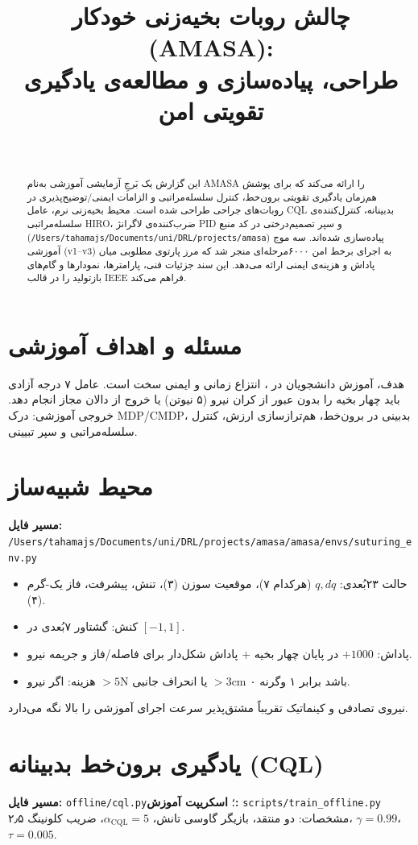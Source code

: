 \documentclass[conference]{IEEEtran}
\title{چالش روبات بخیه‌زنی خودکار (AMASA):\\
طراحی، پیاده‌سازی و مطالعه‌ی یادگیری تقویتی امن}
\author{\IEEEauthorblockN{کدکس}\\
\IEEEauthorblockA{/Users/tahamajs/Documents/uni/DRL/projects/amasa}}
\begin{document}
\maketitle
\begin{abstract}
این گزارش یک بَرجِ آزمایشی آموزشی به‌نام AMASA را ارائه می‌کند که برای پوشش هم‌زمان یادگیری تقویتی برون‌خط، کنترل سلسله‌مراتبی و الزامات ایمنی/توضیح‌پذیری در روبات‌های جراحی طراحی شده است. محیط بخیه‌زنی نرم، عامل CQL بدبینانه، کنترل‌کننده‌ی سلسله‌مراتبی HIRO، ضرب‌کننده‌ی لاگرانژ PID و سپر تصمیم‌درختی در کد منبع (\texttt{/Users/tahamajs/Documents/uni/DRL/projects/amasa}) پیاده‌سازی شده‌اند. سه موج آموزشی (v1–v3) به اجرای برخط امن ۶۰۰۰‌مرحله‌ای منجر شد که مرز پارتوی مطلوبی میان پاداش و هزینه‌ی ایمنی ارائه می‌دهد. این سند جزئیات فنی، پارامترها، نمودارها و گام‌های بازتولید را در قالب IEEE فراهم می‌کند.
\end{abstract}

\section{مسئله و اهداف آموزشی}
هدف، آموزش دانشجویان در ، انتزاع زمانی و ایمنی سخت است. عامل ۷ درجه آزادی باید چهار بخیه را بدون عبور از کران نیرو (۵ نیوتن) یا خروج از دالان مجاز انجام دهد. خروجی آموزشی: درک MDP/CMDP، بدبینی در برون‌خط، هم‌ترازسازی ارزش، کنترل سلسله‌مراتبی و سپر تبیینی.

\section{محیط شبیه‌ساز}
\textbf{مسیر فایل:} \texttt{/Users/tahamajs/Documents/uni/DRL/projects/amasa/amasa/envs/suturing\_env.py}
\begin{itemize}[leftmargin=*]
    \item حالت ۲۳‌بُعدی: $q,dq$ (هرکدام ۷)، موقعیت سوزن (۳)، تنش، پیشرفت، فاز یک-گرم (۴).
    \item کنش: گشتاور ۷‌بُعدی در $[-1,1]$.
    \item پاداش: $+1000$ در پایان چهار بخیه + پاداش شکل‌دار برای فاصله/فاز و جریمه نیرو.
    \item هزینه: اگر نیرو $>5$N یا انحراف جانبی $>3$cm باشد برابر ۱ وگرنه ۰.
\end{itemize}
نیروی تصادفی و کینماتیک تقریباً مشتق‌پذیر سرعت اجرای آموزشی را بالا نگه می‌دارد.

\section{یادگیری برون‌خط بدبینانه (CQL)}
\textbf{مسیر فایل:} \texttt{offline/cql.py}؛ \textbf{اسکریپت آموزش:} \texttt{scripts/train\_offline.py}\\
مشخصات: دو منتقد، بازیگر گاوسی تانش، $\alpha_{\text{CQL}}{=}5$، ضریب کلونینگ ۲٫۵، $\gamma{=}0.99$، $\tau{=}0.005$.
\end{document}
